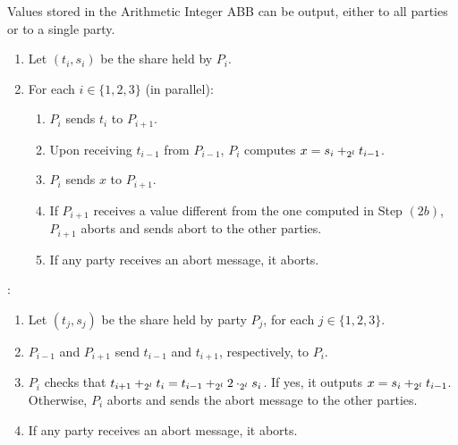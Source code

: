 Values stored in the Arithmetic Integer ABB can be output, either to all parties or to a single party.

\begin{protocol}[Output]
	\begin{enumerate}
		\item Let $(t_i, s_i)$ be the share held by $P_i$.
		\item For each $i \in \{1, 2, 3\}$ (in parallel):
			\begin{enumerate}
                \item $P_i$ sends $t_i$ to $P_{i + 1}$.
                \item Upon receiving $t_{i - 1}$ from $P_{i - 1}$, $P_i$ computes $x = s_i +_{2^l} t_{i - 1}$.
                \item $P_i$ sends $x$ to $P_{i + 1}$.
				\item If $P_{i + 1}$ receives a value different from the one computed in Step $(2b)$, $P_{i + 1}$ aborts and sends abort to the other parties.
				\item If any party receives an abort message, it aborts.
			\end{enumerate}
	\end{enumerate}

	\noindent {}:
	\begin{enumerate}
		\item Let $(t_j, s_j)$ be the share held by party $P_j$, for each $j \in \{1, 2, 3\}$.
		\item $P_{i - 1}$ and $P_{i + 1}$ send $t_{i - 1}$ and $t_{i + 1}$, respectively, to $P_i$.
		\item $P_i$ checks that $t_{i + 1} +_{2^l} t_i = t_{i - 1} +_{2^l} 2 \cdot_{2^l} s_i$. If yes, it outputs $x = s_i +_{2^l} t_{i - 1}$.
        Otherwise, $P_i$ aborts and sends the abort message to the other parties.
		\item If any party receives an abort message, it aborts.
	\end{enumerate}
\end{protocol}
